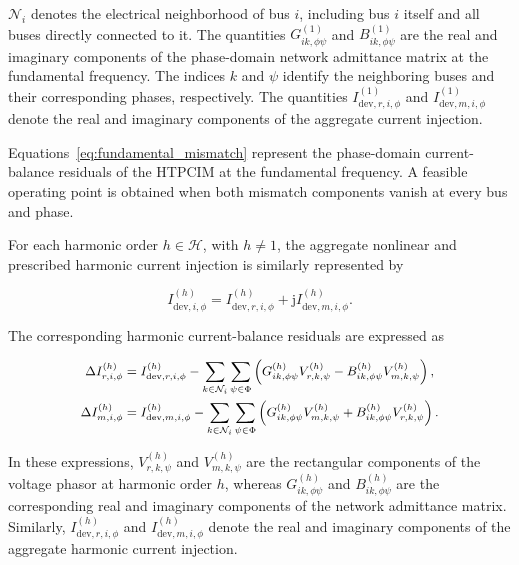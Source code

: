 \documentclass[journal]{IEEEtran}
\begin{document}
$\mathcal{N}_i$ denotes the electrical neighborhood of bus $i$,
including bus $i$ itself and all buses directly connected to it.
The quantities $G_{ik,\phi\psi}^{(1)}$ and
$B_{ik,\phi\psi}^{(1)}$ are the real and imaginary components of the
phase-domain network admittance matrix at the fundamental frequency.
The indices $k$ and $\psi$ identify the neighboring buses and their
corresponding phases, respectively. The quantities
$I_{\mathrm{dev},r,i,\phi}^{(1)}$ and
$I_{\mathrm{dev},m,i,\phi}^{(1)}$ denote the real and imaginary
components of the aggregate current injection.

Equations~\eqref{eq:fundamental_mismatch} represent the phase-domain
current-balance residuals of the HTPCIM at the fundamental frequency.
A feasible operating point is obtained when both mismatch components
vanish at every bus and phase.

For each harmonic order $h\in\mathcal{H}$, with
$h\neq1$, the aggregate nonlinear and prescribed harmonic current
injection is similarly represented by

\begin{equation}
    I_{\mathrm{dev},i,\phi}^{(h)}
    =I_{\mathrm{dev},r,i,\phi}^{(h)}
    +\mathrm{j}I_{\mathrm{dev},m,i,\phi}^{(h)}.
\end{equation}

The corresponding harmonic current-balance residuals are expressed as

\begin{subequations}\small
\label{eq:harmonic_mismatch}
\begin{align}
    \Delta I_{r,i,\phi}^{(h)}
    &=I_{\mathrm{dev},r,i,\phi}^{(h)}-
    \sum_{k\in\mathcal{N}_i}\sum_{\psi\in\Phi}
    \left(G_{ik,\phi\psi}^{(h)}V_{r,k,\psi}^{(h)}-
    B_{ik,\phi\psi}^{(h)}V_{m,k,\psi}^{(h)}\right),\\
    \Delta I_{m,i,\phi}^{(h)}
    &=I_{\mathrm{dev},m,i,\phi}^{(h)}-
    \sum_{k\in\mathcal{N}_i}\sum_{\psi\in\Phi}
    \left(G_{ik,\phi\psi}^{(h)}V_{m,k,\psi}^{(h)}+
    B_{ik,\phi\psi}^{(h)}V_{r,k,\psi}^{(h)}\right).
\end{align}
\end{subequations}

In these expressions, $V_{r,k,\psi}^{(h)}$ and
$V_{m,k,\psi}^{(h)}$ are the rectangular components of the voltage
phasor at harmonic order $h$, whereas
$G_{ik,\phi\psi}^{(h)}$ and $B_{ik,\phi\psi}^{(h)}$ are the
corresponding real and imaginary components of the network admittance
matrix. Similarly, $I_{\mathrm{dev},r,i,\phi}^{(h)}$ and
$I_{\mathrm{dev},m,i,\phi}^{(h)}$ denote the real and imaginary
components of the aggregate harmonic current injection.
\end{document}

